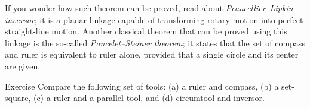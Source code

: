 If you wonder how such theorem can be proved, read about \emph{Peaucellier--Lipkin inversor};
it is a planar linkage capable of transforming rotary motion into perfect straight-line motion.
Another classical theorem that can be proved using this linkage is the so-called \emph{Poncelet--Steiner theorem};
it states that the set of compass and ruler is equivalent to ruler alone, provided that a single circle and its center are given.

\begin{thm}{Exercise}\label{ex:comparison}
Compare the following set of tools:
(a) a ruler and compass, 
(b) a set-square, 
(c) a ruler and a parallel tool,
and
(d) circumtool and inversor.
\end{thm}


